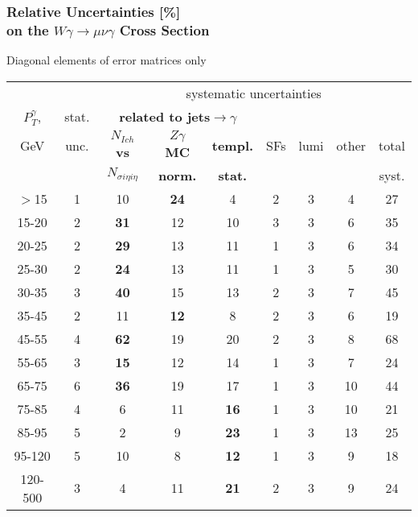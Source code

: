 \begin{frame}\frametitle{Relative Uncertainties [\%]\\ 
          on the $W\gamma\rightarrow\mu\nu\gamma$ Cross Section}
\footnotesize
Diagonal elements of error matrices only
\begin{table}[h]
  \tiny
  \begin{center}
   \begin{tabular}{|c|c|c|c|c|c|c|c|c|}
    \hline
                   &     & \multicolumn{7}{|c|}{systematic uncertainties}     \\
    $P_T^{\gamma}$,  & stat. & \multicolumn{3}{|c|}{\color{blue}\bfseries{related to jets$\rightarrow\gamma$}} &  &  &  & \\
    GeV           & unc. & {\color{blue}\bfseries{$N_{Ich}$ vs}} &{\color{blue}\bfseries{$Z\gamma$ MC}}      &{\color{blue}\bfseries{templ.}} & SFs & lumi & other & total\\ 
                  &     & {\color{blue}\bfseries{$N_{\sigma{i\eta i\eta}}$}} & {\color{blue}\bfseries{norm.}}    & {\color{blue}\bfseries{stat.}}  &  &  &  & syst.\\ \hline
    $>$15  & 1 & 10 & {\color{blue}\bfseries{24}} & 4 & 2 & 3 & 4 & 27 \\ \hline
    15-20 & 2 & {\color{blue}\bfseries{31}} & 12 & 10 & 3 & 3 & 6 & 35 \\ \hline
    20-25 & 2 & {\color{blue}\bfseries{29}} & 13 & 11 & 1 & 3 & 6 & 34 \\ \hline
    25-30 & 2 & {\color{blue}\bfseries{24}} & 13 & 11 & 1 & 3 & 5 & 30 \\ \hline
    30-35 & 3 & {\color{blue}\bfseries{40}} & 15 & 13 & 2 & 3 & 7 & 45 \\ \hline
    35-45 & 2 & 11 & {\color{blue}\bfseries{12}} & 8 & 2 & 3 & 6 & 19 \\ \hline
    45-55 & 4 & {\color{blue}\bfseries{62}} & 19 & 20 & 2 & 3 & 8 & 68 \\ \hline
    55-65 & 3 & {\color{blue}\bfseries{15}} & 12 & 14 & 1 & 3 & 7 & 24 \\ \hline
    65-75 & 6 & {\color{blue}\bfseries{36}} & 19 & 17 & 1 & 3 & 10 & 44 \\ \hline
    75-85 & 4 & 6 & 11 & {\color{blue}\bfseries{16}} & 1 & 3 & 10 & 21 \\ \hline
    85-95 & 5 & 2 & 9 & {\color{blue}\bfseries{23}} & 1 & 3 & 13 & 25 \\ \hline
    95-120 & 5 & 10 & 8 & {\color{blue}\bfseries{12}} & 1 & 3 & 9 & 18 \\ \hline
    120-500 & 3 & 4 & 11 & {\color{blue}\bfseries{21}} & 2 & 3 & 9 & 24 \\ \hline
  \end{tabular}
  \label{tab:systInPercent_MUON_WGamma}
  \end{center}
\end{table}
\end{frame}%
